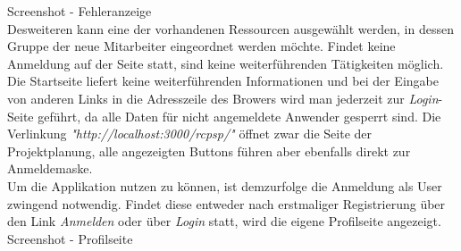 \documentclass[a4paper,12pt,parskip,bibtotoc,liststotoc]{article}
\begin{document}
Screenshot - Fehleranzeige\\

Desweiteren kann eine der vorhandenen Ressourcen ausgewählt werden, in dessen Gruppe der neue Mitarbeiter eingeordnet werden möchte. Findet keine Anmeldung auf der Seite statt, sind keine weiterführenden Tätigkeiten möglich. Die Startseite liefert keine weiterführenden Informationen und bei der Eingabe von anderen Links in die Adresszeile des Browers wird man jederzeit zur \textit{Login}-Seite geführt, da alle Daten für nicht angemeldete Anwender gesperrt sind. Die Verlinkung \textit{"http://localhost:3000/rcpsp/"} öffnet zwar die Seite der Projektplanung, alle angezeigten Buttons führen aber ebenfalls direkt zur Anmeldemaske. \\

Um die Applikation nutzen zu können, ist demzurfolge die Anmeldung als User zwingend notwendig. Findet diese entweder nach erstmaliger Registrierung über den Link \textit{Anmelden} oder über \textit{Login} statt, wird die eigene Profilseite angezeigt.\\

Screenshot - Profilseite\\
\end{document}
